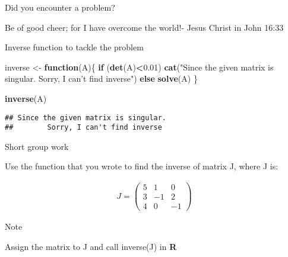 \documentclass[ignorenonframetext,]{beamer}
\newenvironment{Shaded}{\begin{snugshade}}{\end{snugshade}}
\newcommand{\KeywordTok}[1]{\textcolor[rgb]{0.13,0.29,0.53}{\textbf{#1}}}
\newcommand{\FloatTok}[1]{\textcolor[rgb]{0.00,0.00,0.81}{#1}}
\newcommand{\StringTok}[1]{\textcolor[rgb]{0.31,0.60,0.02}{#1}}
\newcommand{\ControlFlowTok}[1]{\textcolor[rgb]{0.13,0.29,0.53}{\textbf{#1}}}
\newcommand{\OperatorTok}[1]{\textcolor[rgb]{0.81,0.36,0.00}{\textbf{#1}}}
\newcommand{\NormalTok}[1]{#1}
\begin{document}
\begin{frame}{Did you encounter a problem?}

Be of good cheer; for I have overcome the world!- Jesus Christ in John
16:33

\end{frame}

\begin{frame}[fragile]{Inverse function to tackle the problem}

\begin{Shaded}
\begin{Highlighting}[]
\NormalTok{inverse <-}\StringTok{ }\ControlFlowTok{function}\NormalTok{(A)\{}
  \ControlFlowTok{if}\NormalTok{ (}\KeywordTok{det}\NormalTok{(A)}\OperatorTok{<}\FloatTok{0.01}\NormalTok{)}
   \KeywordTok{cat}\NormalTok{(}\StringTok{"Since the given matrix is singular. }
\StringTok{       Sorry, I can't find inverse"}\NormalTok{)}
  \ControlFlowTok{else} 
    \KeywordTok{solve}\NormalTok{(A)}
\NormalTok{  \}}
\end{Highlighting}
\end{Shaded}

\begin{Shaded}
\begin{Highlighting}[]
\KeywordTok{inverse}\NormalTok{(A)}
\end{Highlighting}
\end{Shaded}

\begin{verbatim}
## Since the given matrix is singular. 
##        Sorry, I can't find inverse
\end{verbatim}

\end{frame}

\begin{frame}{Short group work}

Use the function that you wrote to find the inverse of matrix J, where J
is:

\begin{align*}
J=\begin{pmatrix}
5& 1&    0\\
3&   -1&    2\\
4&    0 &  -1
\end{pmatrix}\end{align*}

\begin{block}{Note}

Assign the matrix to J and call inverse(J) in \textbf{R}

\end{block}

\end{frame}
\end{document}
